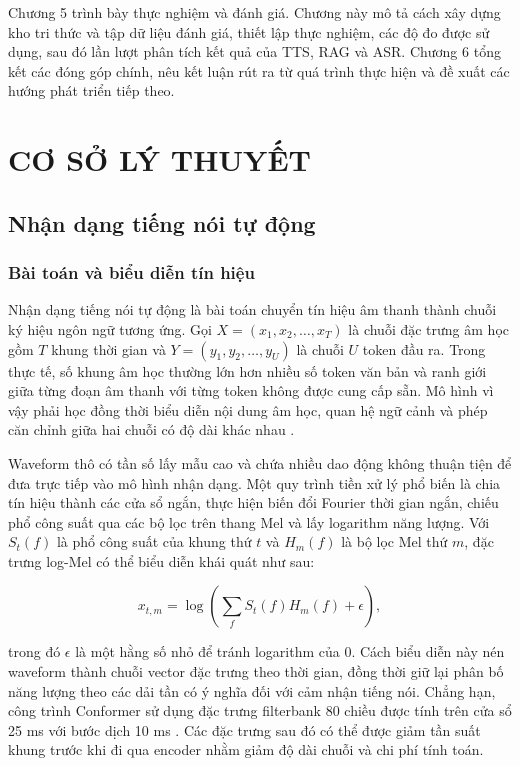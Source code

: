 \documentclass[a4paper,13pt,twoside]{report}
\begin{document}
Chương 5 trình bày thực nghiệm và đánh giá. Chương này mô tả cách xây dựng kho tri thức và tập dữ liệu đánh giá, thiết lập thực nghiệm, các độ đo được sử dụng, sau đó lần lượt phân tích kết quả của TTS, RAG và ASR. Chương 6 tổng kết các đóng góp chính, nêu kết luận rút ra từ quá trình thực hiện và đề xuất các hướng phát triển tiếp theo.

\chapter{CƠ SỞ LÝ THUYẾT}

\section{Nhận dạng tiếng nói tự động}

\subsection{Bài toán và biểu diễn tín hiệu}

Nhận dạng tiếng nói tự động là bài toán chuyển tín hiệu âm thanh thành chuỗi ký hiệu ngôn ngữ tương ứng. Gọi \(X=(x_1,x_2,\ldots,x_T)\) là chuỗi đặc trưng âm học gồm \(T\) khung thời gian và \(Y=(y_1,y_2,\ldots,y_U)\) là chuỗi \(U\) token đầu ra. Trong thực tế, số khung âm học thường lớn hơn nhiều số token văn bản và ranh giới giữa từng đoạn âm thanh với từng token không được cung cấp sẵn. Mô hình vì vậy phải học đồng thời biểu diễn nội dung âm học, quan hệ ngữ cảnh và phép căn chỉnh giữa hai chuỗi có độ dài khác nhau \cite{rnnt}.

Waveform thô có tần số lấy mẫu cao và chứa nhiều dao động không thuận tiện để đưa trực tiếp vào mô hình nhận dạng. Một quy trình tiền xử lý phổ biến là chia tín hiệu thành các cửa sổ ngắn, thực hiện biến đổi Fourier thời gian ngắn, chiếu phổ công suất qua các bộ lọc trên thang Mel và lấy logarithm năng lượng. Với \(S_t(f)\) là phổ công suất của khung thứ \(t\) và \(H_m(f)\) là bộ lọc Mel thứ \(m\), đặc trưng log-Mel có thể biểu diễn khái quát như sau:

\begin{equation}
    x_{t,m}
    =
    \log\left(
    \sum_f S_t(f)H_m(f)+\epsilon
    \right),
\end{equation}

trong đó \(\epsilon\) là một hằng số nhỏ để tránh logarithm của 0. Cách biểu diễn này nén waveform thành chuỗi vector đặc trưng theo thời gian, đồng thời giữ lại phân bố năng lượng theo các dải tần có ý nghĩa đối với cảm nhận tiếng nói. Chẳng hạn, công trình Conformer sử dụng đặc trưng filterbank 80 chiều được tính trên cửa sổ 25 ms với bước dịch 10 ms \cite{conformer}. Các đặc trưng sau đó có thể được giảm tần suất khung trước khi đi qua encoder nhằm giảm độ dài chuỗi và chi phí tính toán.
\end{document}
